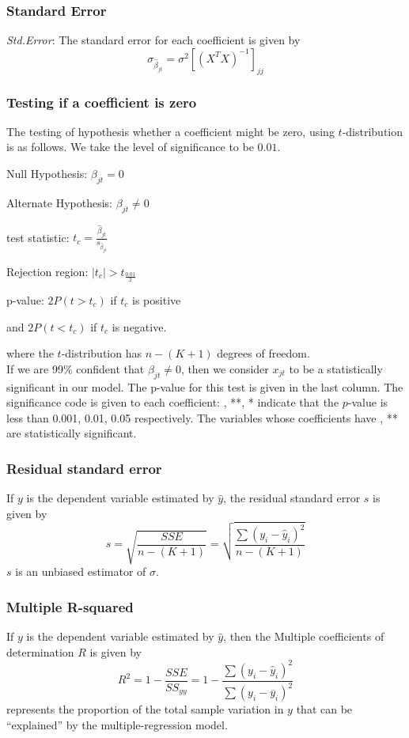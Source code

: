 \documentclass[12pt]{article}
\begin{document}
\subsubsection{Standard Error} \textit{Std.Error}: The standard error for each coefficient is given by
$$\sigma_{\hat \beta_{jt}}=\sigma^2[(X^TX)^{-1}]_{jj}$$
\subsubsection{Testing if a coefficient is zero} The testing of hypothesis whether a coefficient might be zero, using $t$-distribution is as follows.  We take the level of significance to be $0.01$.
    \begin{center}
        Null Hypothesis: $\beta_{jt}=0$
        
        Alternate Hypothesis: $\beta_{jt}\neq 0$
        
        test statistic: $t_c=\frac{\hat \beta_{jt}}{s_{\hat \beta_{jt}}}$
        
        Rejection region: $|t_c|>t_{\frac{0.01}{2}}$
        
        p-value: $2P(t>t_c)$ if $t_c$ is positive 
        
        and $2P(t<t_c)$ if $t_c$ is negative.
    \end{center} 
where the $t$-distribution has $n-(K+1)$ degrees of freedom.
\\ If we are 99\% confident that $\beta_{jt}\neq 0$, then we consider $x_{jt}$ to be a statistically significant in our model.
The p-value for this test is given in the last column. The significance code is given to each coefficient: , **, * indicate that the $p$-value is less than 0.001, 0.01, 0.05 respectively. The variables whose coefficients have , ** are statistically significant.
\subsubsection{{Residual standard error}} If $y$ is the dependent variable estimated by $\hat y$, the residual standard error $s$ is given by
$$s=\sqrt{\frac{SSE}{n-(K+1)}}=\sqrt{\frac{\sum {(y_i-\hat y_i)^2}}{n-(K+1)}}$$
$s$ is an unbiased estimator of $\sigma$.
\subsubsection{{Multiple R-squared}} If $y$ is the dependent variable estimated by $\hat y$, then the Multiple coefficients of determination $R$ is given by $$R^2=1-\frac{SSE}{SS_{yy}}=1-\frac{\sum {(y_i-\hat y_i)^2}}{\sum {(y_i- \overline{y}_i)^2}}$$ 
represents  the  proportion  of  the  total  sample  variation  in  $y$  that  can  be  ``explained'' by the multiple-regression model.
\end{document}
